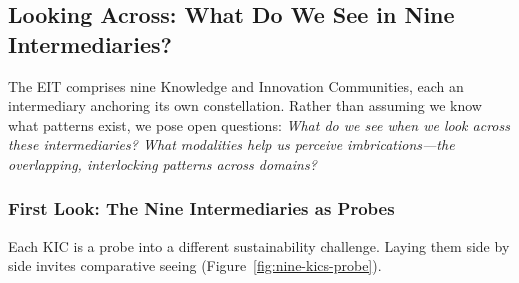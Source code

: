 
\subsection{Looking Across: What Do We See in Nine Intermediaries?}

The EIT comprises nine Knowledge and Innovation Communities, each an intermediary anchoring its own constellation. Rather than assuming we know what patterns exist, we pose open questions: \textit{What do we see when we look across these intermediaries? What modalities help us perceive imbrications---the overlapping, interlocking patterns across domains?}

\subsubsection{First Look: The Nine Intermediaries as Probes}

Each KIC is a probe into a different sustainability challenge. Laying them side by side invites comparative seeing (Figure~\ref{fig:nine-kics-probe}).

